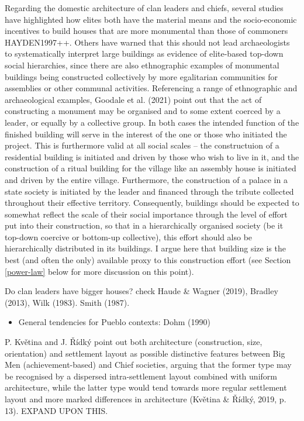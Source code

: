 \documentclass[
  12pt,
]{book}
\providecommand{\tightlist}{%
  \setlength{\itemsep}{0pt}\setlength{\parskip}{0pt}}
\begin{document}
Regarding the domestic architecture of clan leaders and chiefs, several studies have highlighted how elites both have the material means and the socio-economic incentives to build houses that are more monumental than those of commoners HAYDEN1997++. Others have warned that this should not lead archaeologists to systematically interpret large buildings as evidence of elite-based top-down social hierarchies, since there are also ethnographic examples of monumental buildings being constructed collectively by more egalitarian communities for assemblies or other communal activities. Referencing a range of ethnographic and archaeological examples, Goodale et al. (2021) point out that the act of constructing a monument may be organised and to some extent coerced by a leader, or equally by a collective group. In both cases the intended function of the finished building will serve in the interest of the one or those who initiated the project. This is furthermore valid at all social scales -- the constructuion of a residential building is initiated and driven by those who wish to live in it, and the construction of a ritual building for the village like an assembly house is initiated and driven by the entire village. Furthermore, the construction of a palace in a state society is initiated by the leader and financed through the tribute collected throughout their effective territory. Consequently, buildings should be expected to somewhat reflect the scale of their social importance through the level of effort put into their construction, so that in a hierarchically organised society (be it top-down coercive or bottom-up collective), this effort should also be hierarchically distributed in its buildings. I argue here that building size is the best (and often the only) available proxy to this construction effort (see Section \ref{power-law} below for more discussion on this point).

Do clan leaders have bigger houses? check Haude \& Wagner (2019), Bradley (2013), Wilk (1983). Smith (1987).

\begin{itemize}
\tightlist
\item
  General tendencies for Pueblo contexts: Dohm (1990)
\end{itemize}

P. Květina and J. Řídký point out both architecture (construction, size, orientation) and settlement layout as possible distinctive features between Big Men (achievement-based) and Chief societies, arguing that the former type may be recognised by a dispersed intra-settlement layout combined with uniform architecture, while the latter type would tend towards more regular settlement layout and more marked differences in architecture (Květina \& Řídký, 2019, p. 13). EXPAND UPON THIS.
\end{document}
